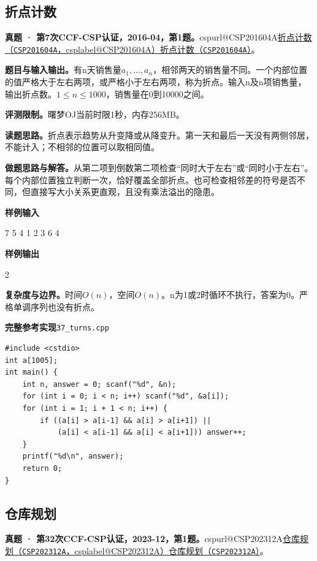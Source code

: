 \documentclass[UTF8,11pt,a4paper,fontset=none]{ctexart}
\makeatletter
\newcommand{\csp}[2]{\ifcsname cspurl@#1\endcsname\href{\csname cspurl@#1\endcsname}{#2（\texttt{#1}，\csname csplabel@#1\endcsname）}\else\href{https://oj.shumeng.tech/p/#1}{#2（\texttt{#1}）}\fi}
\makeatother
\begin{document}
\subsection{折点计数}
\textbf{真题 · 第7次CCF-CSP认证，2016-04，第1题。}\csp{CSP201604A}{折点计数}。

\noindent\textbf{题目与输入输出。}有n天销售量$a_1,\ldots,a_n$，相邻两天的销售量不同。一个内部位置的值严格大于左右两项，或严格小于左右两项，称为折点。输入n及n项销售量，输出折点数。$1\le n\le1000$，销售量在0到10000之间。

\noindent\textbf{评测限制。}曙梦OJ当前时限1秒，内存256MB。

\noindent\textbf{读题思路。}折点表示趋势从升变降或从降变升。第一天和最后一天没有两侧邻居，不能计入；不相邻的位置可以取相同值。

\noindent\textbf{做题思路与解答。}从第二项到倒数第二项检查“同时大于左右”或“同时小于左右”。每个内部位置独立判断一次，恰好覆盖全部折点。也可检查相邻差的符号是否不同，但直接写大小关系更直观，且没有乘法溢出的隐患。
\begin{tcolorbox}[samplebox,title={输入输出样例}]
\textbf{样例输入}
\begin{Sample}
7
5 4 1 2 3 6 4
\end{Sample}
\tcblower
\textbf{样例输出}
\begin{Sample}
2
\end{Sample}
\end{tcolorbox}

\noindent\textbf{复杂度与边界。}时间$O(n)$，空间$O(n)$。n为1或2时循环不执行，答案为0。严格单调序列也没有折点。
\par\noindent\begin{minipage}{\linewidth}
\textbf{完整参考实现}\quad\texttt{37\_turns.cpp}
\begin{lstlisting}
#include <cstdio>
int a[1005];
int main() {
    int n, answer = 0; scanf("%d", &n);
    for (int i = 0; i < n; i++) scanf("%d", &a[i]);
    for (int i = 1; i + 1 < n; i++) {
        if ((a[i] > a[i-1] && a[i] > a[i+1]) ||
            (a[i] < a[i-1] && a[i] < a[i+1])) answer++;
    }
    printf("%d\n", answer);
    return 0;
}
\end{lstlisting}
\end{minipage}\par

\subsection{仓库规划}
\textbf{真题 · 第32次CCF-CSP认证，2023-12，第1题。}\csp{CSP202312A}{仓库规划}。
\end{document}
